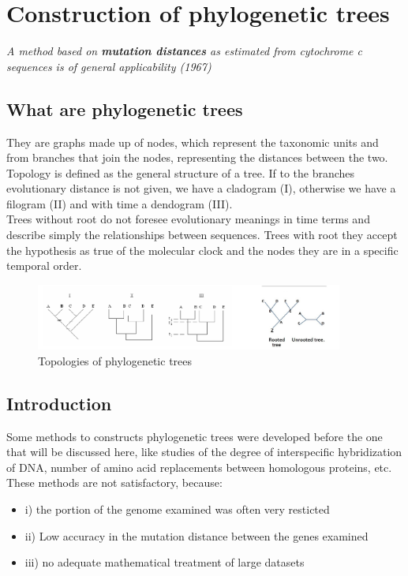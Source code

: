 \graphicspath{{chapters/13/}}
\chapter{Construction of phylogenetic trees}
\emph{A method based on \textbf{mutation distances} as estimated from cytochrome \textit{c} sequences is of general applicability (1967)}

\section{What are phylogenetic trees}
They are graphs made up of nodes, which represent the taxonomic units and from branches that join the nodes, representing the distances between the two.
\\
Topology is defined as the general structure of a tree. If to the branches evolutionary distance is not given, we have a cladogram (I), otherwise we have a filogram (II) and with time a dendogram (III).
\\
Trees without root do not foresee evolutionary meanings in time terms and describe simply the relationships between sequences. Trees with root they accept the hypothesis as true of the molecular clock and the nodes they are in a specific
temporal order.
\begin{figure}[H]
		\centering
		\includegraphics[width=0.9\textwidth]{grams.png}
		\caption{Topologies of phylogenetic trees}
		\label{fig:1}
	\end{figure}

\section{Introduction}
Some methods to constructs phylogenetic trees were developed before the one that will be discussed here, like studies of the degree of interspecific hybridization of DNA, number of amino acid replacements between homologous proteins, etc.
These methods are not satisfactory, because:
\begin{itemize}
\item i) the portion of the genome examined was often very resticted
\item ii) Low accuracy in the mutation distance between the genes examined
\item iii) no adequate mathematical treatment of large datasets
\end{itemize}


